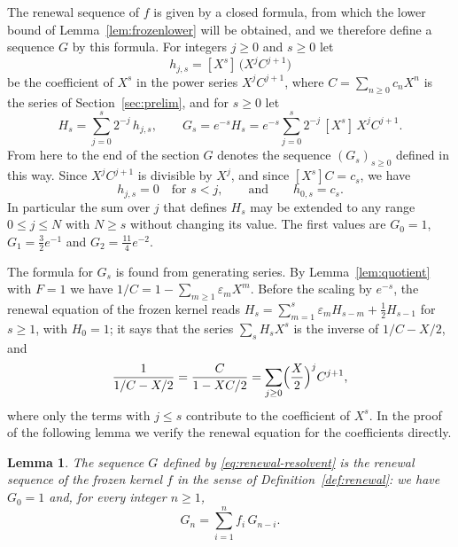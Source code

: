 \documentclass{amsart}
\newtheorem{lemma}[theorem]{Lemma}
\theoremstyle{definition}
\theoremstyle{remark}
\numberwithin{equation}{section}
\begin{document}
The renewal sequence of $f$ is given by a closed formula, from which the lower bound of Lemma~\ref{lem:frozenlower} will be obtained, and we therefore define a sequence $G$ by this formula. For integers $j\ge 0$ and $s\ge 0$ let
\[
h_{j,s}=[X^s]\,\bigl(X^jC^{j+1}\bigr)
\]
be the coefficient of $X^s$ in the power series $X^jC^{j+1}$, where $C=\sum_{n\ge 0}c_nX^n$ is the series of Section~\ref{sec:prelim}, and for $s\ge 0$ let
\begin{equation}\label{eq:renewal-resolvent}
H_s=\sum_{j=0}^{s}2^{-j}\,h_{j,s},\qquad G_s=e^{-s}H_s=e^{-s}\sum_{j=0}^{s}2^{-j}\,[X^s]\,X^jC^{j+1} .
\end{equation}
From here to the end of the section $G$ denotes the sequence $(G_s)_{s\ge 0}$ defined in this way. Since $X^jC^{j+1}$ is divisible by $X^j$, and since $[X^s]C=c_s$, we have
\[
h_{j,s}=0\quad\text{for } s<j,\qquad\text{and}\qquad h_{0,s}=c_s .
\]
In particular the sum over $j$ that defines $H_s$ may be extended to any range $0\le j\le N$ with $N\ge s$ without changing its value. The first values are $G_0=1$, $G_1=\frac32e^{-1}$ and $G_2=\frac{11}{4}e^{-2}$.

The formula for $G_s$ is found from generating series. By Lemma~\ref{lem:quotient} with $F=1$ we have $1/C=1-\sum_{m\ge 1}\varepsilon_mX^m$. Before the scaling by $e^{-s}$, the renewal equation of the frozen kernel reads $H_s=\sum_{m=1}^{s}\varepsilon_mH_{s-m}+\frac12H_{s-1}$ for $s\ge 1$, with $H_0=1$; it says that the series $\sum_sH_sX^s$ is the inverse of $1/C-X/2$, and
\[
\frac{1}{1/C-X/2}=\frac{C}{1-XC/2}=\sum_{j\ge 0}\Bigl(\frac{X}{2}\Bigr)^{j}C^{j+1} ,
\]
where only the terms with $j\le s$ contribute to the coefficient of $X^s$. In the proof of the following lemma we verify the renewal equation for the coefficients directly.

\begin{lemma}\label{lem:frozenrenewal}
The sequence $G$ defined by \eqref{eq:renewal-resolvent} is the renewal sequence of the frozen kernel $f$ in the sense of Definition~\ref{def:renewal}: we have $G_0=1$ and, for every integer $n\ge 1$,
\[
G_n=\sum_{i=1}^{n}f_i\,G_{n-i} .
\]
\end{lemma}
\end{document}
